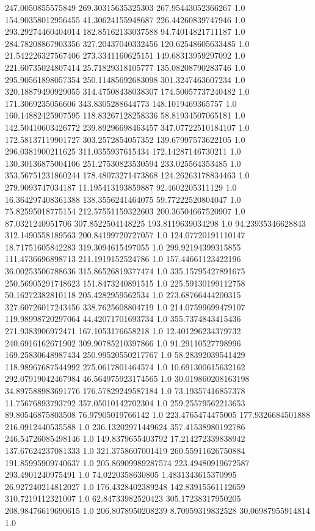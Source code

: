 247.0050855575849	269.30315635325303	267.95443052366267	1.0
154.90358012956455	41.30624155948687	226.44260839747946	1.0
293.29274460404014	182.85162133037588	94.74014821711187	1.0
284.78208867903356	327.20437040332456	120.62548605633485	1.0
21.542226327567406	273.3341160625151	149.68313959297092	1.0
221.60735024807414	25.71829318105777	135.08208790283746	1.0
295.90561898057354	250.11485692683098	301.3247463607234	1.0
320.18879490929055	314.47508438038307	174.50057737240482	1.0
171.3069235056606	343.8305288644773	148.1019469365757	1.0
160.14882425907595	118.83267128258336	58.81934507065181	1.0
142.50410603426772	239.89296698463457	347.07722510184107	1.0
172.58137119901727	303.2572854057352	139.67997573622105	1.0
296.0381900211625	311.0355937615434	172.14287146730211	1.0
130.30136875004106	251.27530823530594	233.025564353485	1.0
353.56751231860244	178.48073271473868	124.26263178834463	1.0
279.9093747034187	11.195413193859887	92.4602205311129	1.0
16.364297408361388	138.3556241464075	59.77222520804047	1.0
75.82595018775154	212.57551159322603	200.36504667520907	1.0
87.0321240951706	307.8522504148225	193.8119639034298	1.0
94.23935346628843	312.1490558189563	200.84199720727057	1.0
124.07720191110147	18.71751605842283	319.3094615497055	1.0
299.92194399315855	111.4736696898713	211.1919152524786	1.0
157.44661123422196	36.00253506788636	315.86526819377474	1.0
335.15795427891675	250.56905291748623	151.8473240891515	1.0
225.59130199112758	50.16272382810118	205.4282959562534	1.0
273.68766444200315	327.60726017243456	338.7625608804719	1.0
214.07599699479107	119.98998720297064	44.42071701693734	1.0
355.7374843415436	271.9383906972471	167.1053176658218	1.0
12.401296234379732	240.6916162671902	309.90785210397866	1.0
91.29110527798996	169.25830648987434	250.99520550217767	1.0
58.28392039541429	118.98967687544992	275.0617801464574	1.0
10.691300615632162	292.07919042467984	46.564975923174565	1.0
30.019860208163198	34.897588983691776	176.57829249587184	1.0
73.19357416857378	11.75676893793792	357.05010142702304	1.0
259.25579562213653	89.80546875803508	76.97905019766142	1.0
223.4765474475005	177.9326684501888	216.0912440535588	1.0
236.13202971449624	357.41538980192786	246.54726085498146	1.0
149.8379655403792	17.214272339838942	137.67624237081333	1.0
321.3758607001419	260.55911626750884	191.85995909740637	1.0
205.86909989287574	223.49480919672587	293.4901240975491	1.0
74.0220358630805	1.4831343615370995	26.927240214812027	1.0
176.4328402389248	142.83915561112659	310.7219112321007	1.0
62.84733982520423	305.17238317950205	208.98476619690615	1.0
206.8078950208239	8.70959319832528	30.06987955914814	1.0
